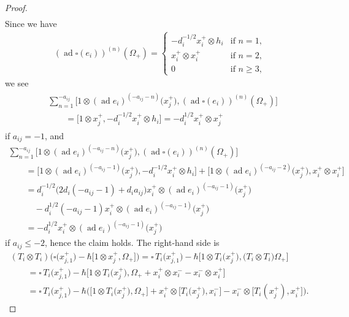 \documentclass[pdftex]{sigma}
\theoremstyle{definition}
\numberwithin{equation}{section}
\DeclareMathOperator{\ad}{ad}
\begin{document}
\begin{proof}
\begin{gather*}
\end{gather*}
Since we have
\begin{gather*}
(\ad \square(e_i))^{(n)}(\Omega_+) = \begin{cases}
-d_i^{-1/2} x_i^+ \otimes h_i & \text{if $n=1$,}\\
x_i^+ \otimes x_i^+ & \text{if $n=2$,}\\
0& \text{if $n \geq 3$,}
\end{cases}
\end{gather*}
we see
\begin{gather*}
\begin{split}&
\sum_{n=1}^{-a_{ij}} \big[1 \otimes (\ad e_i)^{(-a_{ij}-n)}\big(x_j^+\big),(\ad \square(e_i))^{(n)}(\Omega_+)\big] \\
& \qquad{} = \big[1 \otimes x_j^+, -d_i^{-1/2}x_i^+ \otimes h_i\big] = - d_i^{1/2} x_i^+ \otimes x_j^+\end{split}
\end{gather*}
if $a_{ij}=-1$, and
\begin{gather*}
\sum_{n=1}^{-a_{ij}} \big[1 \otimes (\ad e_i)^{(-a_{ij}-n)}\big(x_j^+\big),(\ad \square(e_i))^{(n)}(\Omega_+)\big] \\
\qquad{} = \big[1 \otimes (\ad e_i)^{(-a_{ij}-1)}\big(x_j^+\big), -d_i^{-1/2}x_i^+ \otimes h_i\big] + \big[1 \otimes (\ad e_i)^{(-a_{ij}-2)}\big(x_j^+\big),x_i^+ \otimes x_i^+\big] \\
\qquad{}= d_i^{-1/2}\big( 2d_i(-a_{ij}-1) + d_ia_{ij} \big) x_i^+ \otimes (\ad e_i)^{(-a_{ij}-1)}\big(x_j^+\big) \\
\qquad\quad{}- d_i^{1/2} ( -a_{ij}-1 ) x_i^+ \otimes (\ad e_i)^{(-a_{ij}-1)}\big(x_j^+\big) \\
\qquad {}= - d_i^{1/2} x_i^+ \otimes (\ad e_i)^{(-a_{ij}-1)}\big(x_j^+\big)
\end{gather*}
if $a_{ij} \leq -2$, hence the claim holds. The right-hand side is
\begin{gather*}
(T_i \otimes T_i)\big(\square\big(x_{j,1}^+\big) - \hbar\big[1 \otimes x_j^+,\Omega_+\big]\big) = \square\,T_i\big(x_{j,1}^+\big) - \hbar \big[1 \otimes T_i\big(x_j^+\big),\big(T_i \otimes T_i\big) \Omega_+\big]\\
\qquad{} = \square\,T_i\big(x_{j,1}^+\big) - \hbar \big[1 \otimes T_i\big(x_j^+\big),\Omega_+ + x_i^+ \otimes x_i^- - x_i^- \otimes x_i^+\big]\\
\qquad{} = \square\,T_i\big(x_{j,1}^+\big) - \hbar \big( \big[1 \otimes T_i\big(x_j^+\big),\Omega_+\big] + x_i^+ \otimes \big[T_i\big(x_j^+\big), x_i^-\big] - x_i^- \otimes \big[T_i(x_j^+),x_i^+\big]\big).

\end{gather*}
\end{proof}
\end{document}
